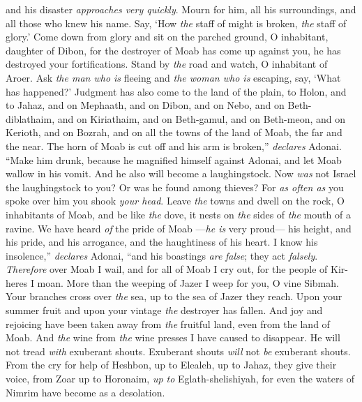 \begin{biblechapter}
and his disaster \textit{approaches very quickly}.
\verse Mourn for him, all his surroundings, 
and all those who knew his name. 
Say, ‘How \textit{the} staff of might is broken, 
\textit{the} staff of glory.’
\verse Come down from glory and sit on the parched ground, 
O inhabitant, daughter of Dibon, 
for the destroyer of Moab has come up against you, 
he has destroyed your fortifications.
\verse Stand by \textit{the} road and watch, 
O inhabitant of Aroer. 
Ask \textit{the man who is} fleeing and \textit{the woman who is} escaping, 
say, ‘What has happened?’
\verse Judgment has also come to the land of the plain, to Holon, and to Jahaz, and on Mephaath,
\verse and on Dibon, and on Nebo, and on Beth-diblathaim,
\verse and on Kiriathaim, and on Beth-gamul, and on Beth-meon,
\verse and on Kerioth, and on Bozrah, and on all the towns of the land of Moab, the far and the near.
\verse The horn of Moab is cut off and his arm is broken,” \textit{declares} Adonai.
\verse “Make him drunk, 
because he magnified himself against Adonai, 
and let Moab wallow in his vomit. 
And he also will become a laughingstock.
\verse Now \textit{was} not Israel the laughingstock to you? 
Or was he found among thieves? 
For \textit{as often as} you spoke over him 
you shook \textit{your head}.
\verse Leave \textit{the} towns and dwell on the rock, 
O inhabitants of Moab, 
and be like \textit{the} dove, 
it nests on \textit{the} sides of \textit{the} mouth of a ravine.
\verse We have heard \textit{of} the pride of Moab 
—\textit{he is} very proud— 
his height, and his pride, and his arrogance, 
and the haughtiness of his heart.
\verse I know his insolence,” \textit{declares} Adonai, 
“and his boastings \textit{are} \textit{false}; 
they act \textit{falsely}.
\verse \textit{Therefore} over Moab I wail, 
and for all of Moab I cry out, 
for the people of Kir-heres I moan.
\verse More than the weeping of Jazer 
I weep for you, O vine Sibmah. 
Your branches cross over \textit{the} sea, 
up to the sea of Jazer they reach. 
Upon your summer fruit and upon your vintage 
\textit{the} destroyer has fallen.
\verse And joy and rejoicing have been taken away from \textit{the} fruitful land, 
even from the land of Moab. 
And \textit{the} wine from \textit{the} wine presses 
I have caused to disappear. 
He will not tread \textit{with} exuberant shouts. 
Exuberant shouts \textit{will} not \textit{be} exuberant shouts.
\verse From the cry for help of Heshbon, up to Elealeh, 
up to Jahaz, they give their voice, 
from Zoar up to Horonaim, \textit{up to} Eglath-shelishiyah, 
for even the waters of Nimrim have become as a desolation.

\end{biblechapter}
